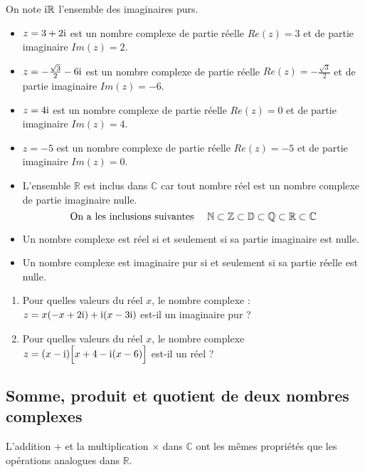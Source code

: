  On note  $ \text{i}\mathbb{R} $ l'ensemble des imaginaires purs.
\begin{example}
\begin{itemize}
\item $ z= 3 + 2\text{i}$ est un nombre complexe de partie réelle $Re(z) = 3$ et de partie imaginaire $Im(z) = 2$.
\item  $z= -\frac{\sqrt{3}}{2} - 6\text{i}$ est un nombre complexe de partie réelle $Re(z) = -\frac{\sqrt{3}}{2}$ et de partie imaginaire $Im(z) =-6$.
\item  $z= 4\text{i}$ est un nombre complexe de partie réelle $Re(z) = 0$ et de partie imaginaire $Im(z) = 4$.
\item $z = −5$ est un nombre complexe de partie réelle $Re(z) = −5$ et de partie imaginaire $Im(z) = 0$.
\end{itemize}
\end{example}
\medskip

\begin{remark}
\begin{itemize}
\item L'ensemble $ \mathbb{R} $ est inclus dans $ \mathbb{C} $ car tout nombre réel  est un nombre complexe de partie imaginaire nulle.
\[\text{On a les inclusions suivantes \quad }\mathbb{N}\subset \mathbb{Z}\subset\mathbb{D}\subset\mathbb{Q}\subset\mathbb{R}\subset\mathbb{C}\]
\item Un nombre complexe est réel si et seulement si sa partie imaginaire est nulle.
\item Un nombre complexe est imaginaire pur si et seulement si sa partie réelle est nulle.
\end{itemize}
\end{remark}
\medskip

\begin{exercice}
\begin{enumerate}
\item  Pour quelles valeurs du réel $ x $, le nombre complexe :\; $ z=x(-x+2\mathrm{i})+\mathrm{i}(x-3\text{i}) $  est-il un imaginaire pur ?
\item  Pour quelles valeurs du réel $ x $, le nombre complexe $ z=(x-\mathrm{i})\Bigl[x+4-\mathrm{i}(x-6)\Bigr] $ est-il un réel ?
\end{enumerate}
\end{exercice}
\subsection*{Somme, produit et quotient de deux nombres complexes}
L'addition $ + $ et la multiplication $ \times $ dans $ \mathbb{C} $ ont les mêmes
propriétés que les opérations analogues dans $ \mathbb{R} $.

